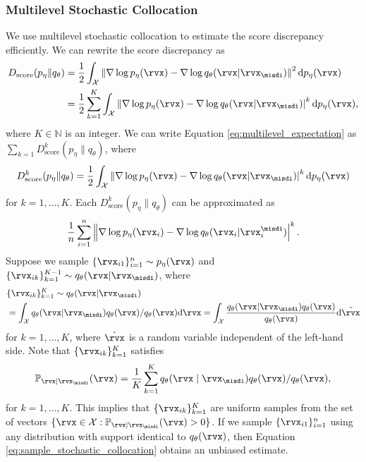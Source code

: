 \documentclass{article} %
\begin{document}
\subsubsection{Multilevel Stochastic Collocation}
We use multilevel stochastic collocation to estimate the score discrepancy efficiently. We can rewrite the score discrepancy as
\begin{align}
	D_{\text{score}}(p_{\eta} \| q_{\theta}) &= \frac{1}{2} \int_{\mathcal{X}} \left\| \nabla \log p_{\eta}(\rvx) - \nabla \log q_{\theta}(\rvx | \rvx_{\misdi}) \right\|^{2} \mathrm{d} p_{\eta}(\rvx) \notag \\
	&= \frac{1}{2} \sum_{k=1}^{K} \int_{\mathcal{X}} \left\| \nabla \log p_{\eta}(\rvx) - \nabla \log q_{\theta}(\rvx | \rvx_{\misdi}) \right|^{k} \mathrm{d} p_{\eta}(\rvx), \label{eq:multilevel_expectation}
\end{align}
where $K \in \mathbb{N}$ is an integer.
We can write Equation \eqref{eq:multilevel_expectation} as $\sum_{k=1} D_{\text{score}}^{k}(p_{\eta} \| q_{\theta})$, where
\begin{align}
    D_{\text{score}}^{k}(p_{\eta} \| q_{\theta}) = \frac{1}{2} \int_{\mathcal{X}}  \left\| \nabla \log p_{\eta}(\rvx) - \nabla \log q_{\theta}(\rvx | \rvx_{\misdi}) \right|^{k} \mathrm{d} p_{\eta}(\rvx) \label{eq:multilevel_expectation_k}
\end{align}
for $k=1,\ldots,K$. Each $D_{\text{score}}^{k}(p_{\eta} \| q_{\theta})$ can be approximated as
\begin{align}
	\frac{1}{n} \sum_{i=1}^{n} \left\| \nabla \log p_{\eta}(\rvx_{i}) - \nabla \log q_{\theta}(\rvx_{i} | \rvx_{i}^{\misdi}) \right|^{k}. \label{eq:multilevel_expectation_k_2}
\end{align}
Suppose we sample $\{\rvx_{i1}\}_{i=1}^{n} \sim p_{\eta}(\rvx)$ and $\{\rvx_{ik}\}_{k=1}^{K-1} \sim q_{\theta}(\rvx | \rvx_{\misdi})$, where
\begin{align}
	&\{\rvx_{ik}\}_{k=1}^{K} \sim q_{\theta}(\rvx | \rvx_{\misdi}) \nonumber \\ 
	&= \int_{\mathcal{X}} q_{\theta}(\rvx | \rvx_{\misdi}) q_{\theta}(\rvx) / q_{\theta}(\rvx) \mathrm{d} \rvx = \int_{\mathcal{X}} \frac{q_{\theta}(\rvx | \rvx_{\misdi}) q_{\theta}(\rvx)}{q_{\theta}(\rvx)} \mathrm{d} \tilde{\rvx}  \label{eq:sample_stochastic_collocation} 
\end{align}
for $k=1,\ldots,K$, where $\tilde{\rvx}$ is a random variable independent of the left-hand side. Note that $\{\rvx_{ik}\}_{k=1}^{K}$ satisfies
\begin{align}
	\mathbb{P}_{\rvx \mid \rvx_{\misdi}} (\rvx) = \frac{1}{K} \sum_{k=1}^{K} q_{\theta}(\rvx \mid \rvx_{\misdi}) q_{\theta}(\rvx)/q_{\theta}(\rvx), \label{eq:stochastic_collocation}
\end{align}
for $k=1,\ldots,K$. This implies that $\{\rvx_{ik}\}_{k=1}^{K}$ are uniform samples from the set of vectors $\{\rvx \in \mathcal{X} : \mathbb{P}_{\rvx \mid \rvx_{\misdi}}(\rvx) > 0 \}$. If we sample $\{\rvx_{i1}\}_{i=1}^{n}$ using any distribution with support identical to $q_{\theta}(\rvx)$, then Equation \eqref{eq:sample_stochastic_collocation} obtains an unbiased estimate.
\end{document}
